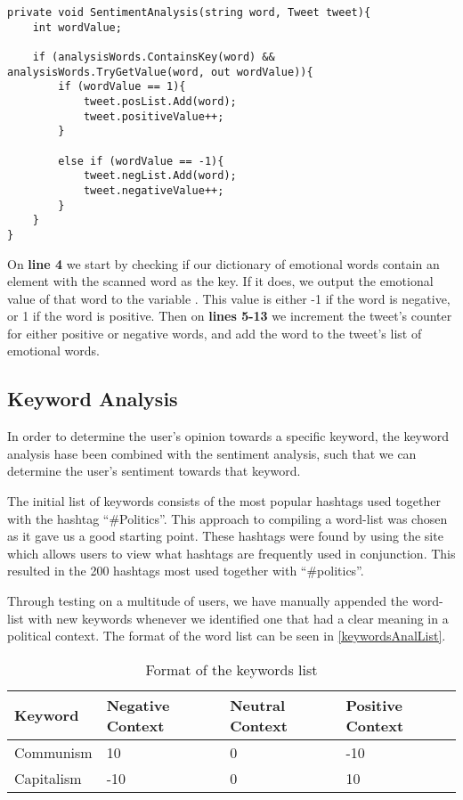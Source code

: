 \begin{minipage}[H]{\linewidth}
\begin{lstlisting}[caption = Determining the sentiment of a tweet , label = sentiAnalCode] 
private void SentimentAnalysis(string word, Tweet tweet){
	int wordValue;

    if (analysisWords.ContainsKey(word) && analysisWords.TryGetValue(word, out wordValue)){
    	if (wordValue == 1){
        	tweet.posList.Add(word);
            tweet.positiveValue++;
        }

        else if (wordValue == -1){
        	tweet.negList.Add(word);
            tweet.negativeValue++;
        }
    }
}
\end{lstlisting}
\end{minipage}

On \textbf{line 4} we start by checking if our dictionary of emotional words
contain an element with the scanned word as the key. If it does, we output the
emotional value of that word to the variable . This value is
either -1 if the word is negative, or 1 if the word is positive. Then on
\textbf{lines 5-13} we increment the tweet's counter for either positive or
negative words, and add the word to the tweet's list of emotional words.

\subsection{Keyword Analysis}
In order to determine the user's opinion towards a specific keyword, the keyword
analysis hase been combined with the sentiment analysis, such that we can
determine the user's sentiment towards that keyword.

The initial list of keywords consists of the most popular hashtags used together
with the hashtag ``\#Politics''. This approach to compiling a word-list was
chosen as it gave us a good starting point. These hashtags were found by using
the site  which allows users to
view what hashtags are frequently used in conjunction. This resulted in the 200 hashtags most used
together with ``\#politics''.\nl

Through testing on a multitude of users, we have manually appended the word-list
with new keywords whenever we identified one that had a clear meaning in a
political context. The format of the word list can be seen in
\autoref{keywordsAnalList}.\\

\begin{table}[H]
\begin{tabular}{|l|l|l|l|}\hline
\textbf{Keyword} & \textbf{Negative Context} & \textbf{Neutral Context} & \textbf{Positive Context} \\\hline
Communism & 10 & 0 & -10 \\\hline
Capitalism & -10 & 0 & 10 \\\hline
\end{tabular}
\caption{Format of the keywords list}
\label{keywordsAnalList}
\end{table} 

